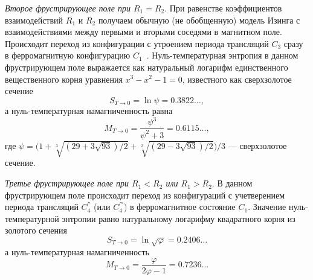 \emph{Второе фрустрирующее поле при $R_1 = R_2$}. При равенстве коэффициентов взаимодействий $R_1$ и $R_2$ получаем обычную (не обобщенную) модель Изинга с взаимодействиями между первыми и вторыми соседями в магнитном поле. Происходит переход из конфигурации с утроением периода трансляций $C_3$ сразу в ферромагнитную конфигурацию $C_1$~\cite{zarubin2019}. Нуль-температурная энтропия в данном фрустрирующем поле выражается как натуральный логарифм единственного вещественного корня уравнения \mbox{$x^3-x^2-1=0$}, известного как сверхзолотое сечение
\begin{equation}
S_{T\rightarrow 0} = \ln \psi = 0.3822\dots,
\label{22}
\end{equation}
а нуль-температурная намагниченность равна
\begin{equation}
M_{T\rightarrow 0} = \frac{\psi^3}{\psi^2+3} = 0.6115\dots,
\label{23}
\end{equation}
где $\psi = \Big(1+\sqrt[3]{(29+3\sqrt{93})/2}+\sqrt[3]{(29-3\sqrt{93})/2}\Big)/3$ --- сверхзолотое сечение.

\emph{Третье фрустрирующее поле при $R_1 < R_2$ или $R_1 > R_2$}. В данном фрустрирующем поле происходит переход из конфигураций с учетверением  периода трансляций $C_{4}^{''}$ (или $C_4^{'''}$) в ферромагнитное состояние $C_1$. Значение нуль-температурной энтропии равно натуральному логарифму квадратного корня из золотого сечения
\begin{equation}
S_{T\rightarrow 0} = \ln \sqrt{\varphi} = 0.2406\dots
\label{24}
\end{equation}
а нуль-температурная намагниченность
\begin{equation}
M_{T\rightarrow 0} = \frac{\varphi}{2\varphi -1} = 0.7236\dots
\label{25}
\end{equation}



